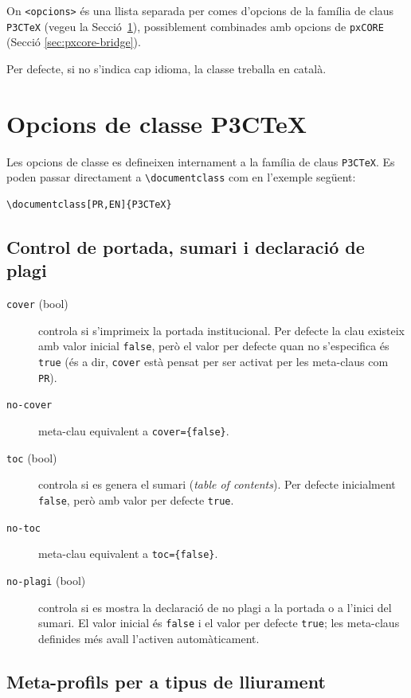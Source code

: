 \documentclass[default]{P3CTeX}
\begin{document}
On \verb|<opcions>| és una llista separada per comes d'opcions de la
família de claus \texttt{P3CTeX} (vegeu la Secció~\ref{sec:class-opts}),
possiblement combinades amb opcions de \texttt{pxCORE} (Secció
\ref{sec:pxcore-bridge}).

Per defecte, si no s'indica cap idioma, la classe treballa en català.

\section{Opcions de classe P3CTeX}\label{sec:class-opts}

Les opcions de classe es defineixen internament a la família de claus
\verb|P3CTeX|. Es poden passar directament a \verb|\documentclass| com
en l'exemple següent:
\begin{verbatim}
\documentclass[PR,EN]{P3CTeX}
\end{verbatim}

\subsection*{Control de portada, sumari i declaració de plagi}

\begin{description}
  \item[\texttt{cover} (bool)] controla si s'imprimeix la portada
    institucional. Per defecte la clau existeix amb valor inicial
    \texttt{false}, però el valor per defecte quan no s'especifica és
    \texttt{true} (és a dir, \texttt{cover} està pensat per ser activat per
    les meta-claus com \texttt{PR}).
  \item[\texttt{no-cover}] meta-clau equivalent a \texttt{cover=\{false\}}.
  \item[\texttt{toc} (bool)] controla si es genera el sumari (\emph{table
    of contents}). Per defecte inicialment \texttt{false}, però amb
    valor per defecte \texttt{true}.
  \item[\texttt{no-toc}] meta-clau equivalent a \texttt{toc=\{false\}}.
  \item[\texttt{no-plagi} (bool)] controla si es mostra la declaració de
    no plagi a la portada o a l'inici del sumari. El valor inicial és
    \texttt{false} i el valor per defecte \texttt{true}; les meta-claus
    definides més avall l'activen automàticament.
\end{description}

\subsection*{Meta-profils per a tipus de lliurament}
\end{document}
